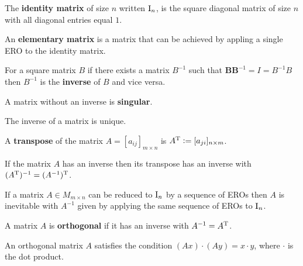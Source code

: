 \documentclass[../Year1/Year1.tex]{subfiles}
\begin{document}
\begin{definition}
    The \textbf{identity matrix} of size $n$ written $\mathrm{I}_{n}$, is the square diagonal matrix of size $n$ with all diagonal entries equal $1$.
\end{definition}

\begin{definition}
    An \textbf{elementary matrix} is a matrix that can be achieved by appling a single ERO to the identity matrix.
\end{definition}

\begin{definition}[Inverse]
    For a square matrix $B$ if there exists a matrix $B^{-1}$ such that $\textbf{BB}^{-1} = I = B^{-1}B$ then $B^{-1}$ is the \textbf{inverse} of $B$ and vice versa.
\end{definition}

\begin{definition}[Singular]
    A matrix without an inverse is \textbf{singular}.
\end{definition}

\begin{theorem}
    The inverse of a matrix is unique.
\end{theorem}

\begin{definition}
    A \textbf{transpose} of the matrix $A = [a_{ij}]_{m\times n}$ is  $A^{\mathrm{T}} := [a_{ji}]_{n\times m}$.
\end{definition}

\begin{theorem}
    If the matrix $A$ has an inverse then its transpose has an inverse with $(A^{\mathrm{T}})^{-1}=(A^{-1})^{\mathrm{T}}$.
\end{theorem}

\begin{theorem}
    If a matrix $A\in M_{m\times n}$ can be reduced to $\mathrm{I}_n$ by a sequence of EROs then $A$ is inevitable with $A^{-1}$ given by applying the same sequence of EROs to $\mathrm{I}_n$.
\end{theorem}

\begin{definition}
    A matrix $A$ is \textbf{orthogonal} if it has an inverse with $A^{-1}=A^{\mathrm{T}}$.
\end{definition}

\begin{theorem}
    An orthogonal matrix $A$ satisfies the condition $(Ax) \cdot (Ay) = x \cdot y$, where $\cdot$ is the dot product.
\end{theorem}
\end{document}
